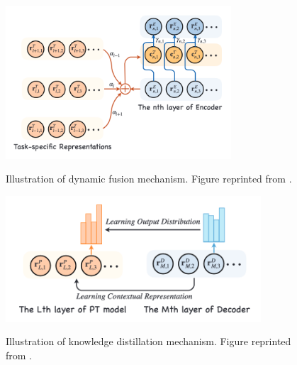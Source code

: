 \begin{figure}[h]
    {\includegraphics[width=0.75\textwidth]{img/dynamic_fusion.png}}
    \centering
    \caption{Illustration of dynamic fusion mechanism. Figure reprinted from \cite{weng2020acquiring}.}
    \label{img:dyn_fn}
\end{figure}

\begin{figure}[h]
    {\includegraphics[width=0.85\textwidth]{img/kdweng.png}}
    \centering
    \caption{Illustration of knowledge distillation mechanism. Figure reprinted from \cite{weng2020acquiring}.}
    \label{img:kdweng}
\end{figure}

